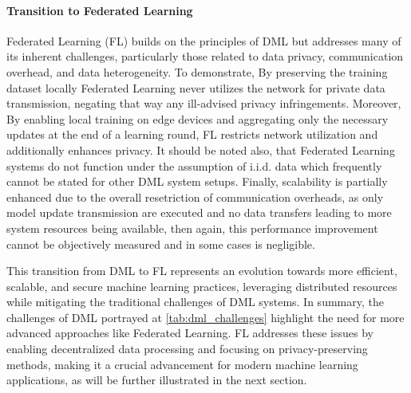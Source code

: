 \paragraph{Transition to Federated Learning}
Federated Learning (FL) builds on the principles of DML but addresses many of its inherent challenges, particularly those related
to data privacy, communication overhead, and data heterogeneity. To demonstrate, By preserving the training dataset locally Federated Learning
never utilizes the network for private data transmission, negating that way any ill-advised privacy infringements. Moreover, By enabling
local training on edge devices and aggregating only the necessary updates at the end of a learning round, FL restricts network utilization
and additionally enhances privacy. It should be noted also, that Federated Learning systems do not function under the assumption of i.i.d.
data which frequently cannot be stated for other DML system setups. Finally, scalability is partially enhanced due to the overall resetriction
of communication overheads, as only model update transmission are executed and no data transfers leading to more system resources being available,
then again, this performance improvement cannot be objectively measured and in some cases is negligible.

This transition from DML to FL represents an evolution towards more efficient, scalable,
and secure machine learning practices, leveraging distributed resources while mitigating the traditional challenges of DML systems.
In summary, the challenges of DML portrayed at \cref{tab:dml_challenges} highlight the need for more advanced approaches like
Federated Learning. FL addresses these issues by enabling decentralized data processing and focusing on privacy-preserving methods,
making it a crucial advancement for modern machine learning applications, as will be further illustrated in the next section.